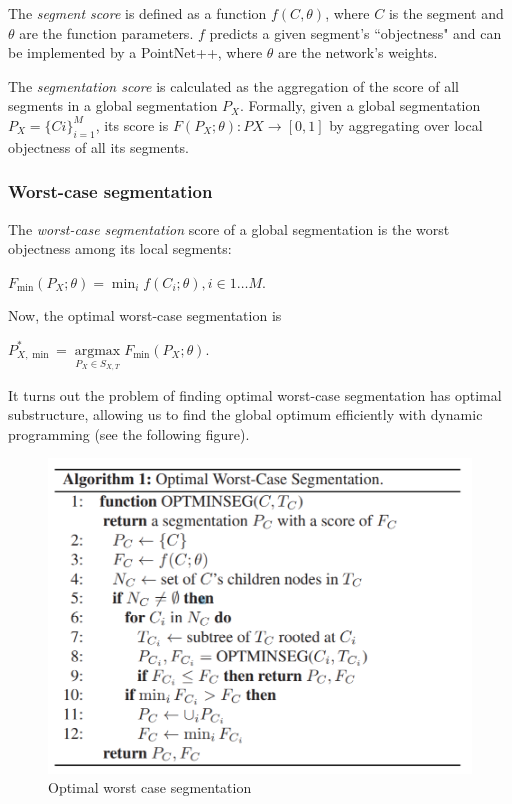 The \emph{segment score} is defined as a function $f(C, \theta)$,
where $C$ is the segment and $\theta$ are the function parameters.
$f$ predicts a given segment's ``objectness" and can be implemented by
a PointNet++, where $\theta$ are the network's weights.

The \emph{segmentation score} is calculated as the aggregation of the
score of all segments in a global segmentation $P_X$. Formally, given
a global segmentation $P_X = \{Ci\}^{M}_{i=1}$, its score is
$F(P_X; \theta) : PX→ [0, 1]$ by aggregating over local objectness of
all its segments.

\subsubsection{Worst-case segmentation}\label{header-n884}

The \emph{worst-case segmentation} score of a global segmentation is the
worst objectness among its local segments:

$ F_{\min }(P_X; \theta) = \min _i{f(C_i; \theta)}, i\in {1 \ldots M}.$

Now, the optimal worst-case segmentation is

$ P_{X,\min }^* = \mathop{\operatorname{argmax}}\limits_{P_X\in S_{X,T}} {F_{\min } (P_X; \theta)} $.

It turns out the problem of finding optimal worst-case segmentation has
optimal substructure, allowing us to find the global optimum efficiently
with dynamic programming (see the following figure).

\begin{figure}[h!]
\centering
\includegraphics[width=0.8\linewidth]{images/worstcaseseg.png}
\caption{Optimal worst case segmentation}
\end{figure}

